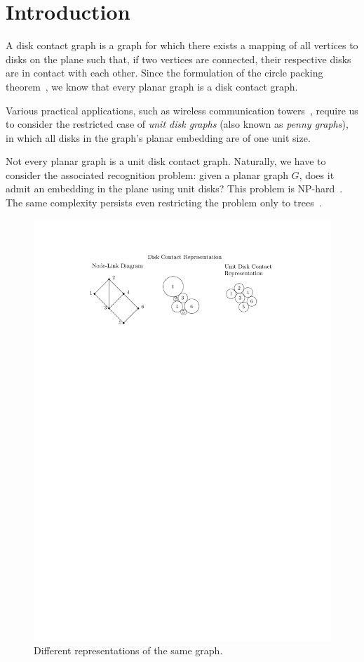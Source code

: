 
\chapter{Introduction}

A disk contact graph is a graph for which there exists a mapping of all vertices to disks on the plane such that, if two vertices are connected, their respective disks are in contact with each other.
Since the formulation of the circle packing theorem~\cite{Koebe1936}, we know that every planar graph is a disk contact graph.

Various practical applications, such as wireless communication towers~\cite{Hale1980}, require us to consider the restricted case of \emph{unit disk graphs} (also known as \emph{penny graphs}), in which all disks in the graph's planar embedding are of one unit size.

Not every planar graph is a unit disk contact graph. Naturally, we have to consider the associated recognition problem: given a planar graph $G$, does it admit an embedding in the plane using unit disks? 
This problem is NP-hard~\cite{Breu1998}. The same complexity persists even restricting the problem only to trees~\cite{Bowen2015}.

\begin{figure}
    \centering
    \includegraphics{graphics/ch1_introduction.pdf}
    \caption{Different representations of the same graph.}
    \label{fig:ch1_introduction}
\end{figure}

